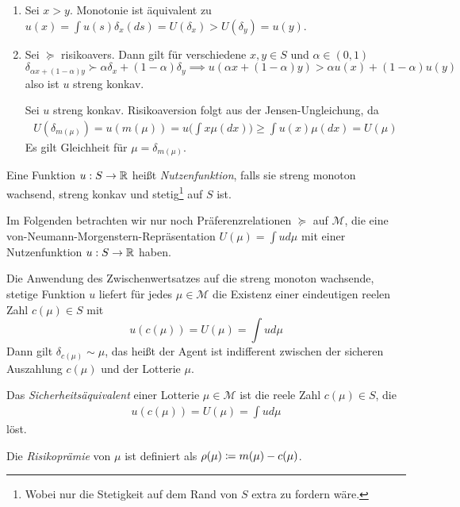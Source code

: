 \documentclass[a4paper,twoside,DIV15,BCOR12mm]{scrbook}
\newcommand{\cM}{\mathcal M}
\begin{document}
\begin{beweis}
\begin{enumerate}
\item Sei $x>y$. Monotonie ist äquivalent zu $u(x)=\int u(s) \delta_x(ds) = U(\delta_x) > U(\delta_y) = u(y)$.
\item Sei $\succeq$ risikoavers. Dann gilt für verschiedene $x,y\in S$ und $\alpha \in (0,1)$
\[
\delta_{\alpha x + (1-\alpha) y} \succ \alpha \delta_x + (1-\alpha)\delta_y
\implies
u(\alpha x + (1-\alpha ) y) > \alpha u(x) + (1-\alpha) u(y)
\]
also ist $u$ streng konkav.

Sei $u$ streng konkav. Risikoaversion folgt aus der Jensen-Ungleichung, da
\begin{align*}
U(\delta_{m(\mu)}) = u(m(\mu)) = u\Big(\int x \mu (dx)\Big) \ge \int u(x) \mu(dx) = U(\mu)
\end{align*}
Es gilt Gleichheit für $\mu = \delta_{m(\mu)}$.
\end{enumerate}
\end{beweis}

\begin{definition}
Eine Funktion $u:S\to\mathbb{R}$ heißt \emph{Nutzenfunktion}, falls sie streng monoton wachsend, streng konkav und stetig\footnote{Wobei nur die Stetigkeit auf dem Rand von $S$ extra zu fordern wäre.} auf $S$ ist.
\end{definition}

Im Folgenden betrachten wir nur noch Präferenzrelationen $\succeq$ auf $\cM$, die eine von-Neumann-Morgenstern-Repräsentation $U(\mu) = \int u d \mu$ mit einer Nutzenfunktion $u:S\to\mathbb{R}$ haben. 

Die Anwendung des Zwischenwertsatzes auf die streng monoton wachsende, stetige Funktion $u$ liefert für jedes $\mu\in\cM$ die Existenz einer eindeutigen reelen Zahl $c(\mu)\in S$ mit
\[u(c(\mu)) = U(\mu) = \int ud\mu\]
Dann gilt $\delta_{c(\mu)} \sim \mu$, das heißt der Agent ist indifferent zwischen der sicheren Auszahlung $c(\mu)$ und der Lotterie $\mu$. 

\begin{definition}
Das \emph{Sicherheitsäquivalent} einer Lotterie $\mu\in \cM$ ist die reele Zahl $c(\mu)\in S$, die 
\begin{align*}
u(c(\mu)) = U(\mu) = \int ud\mu
\end{align*}
löst.

Die \emph{Risikoprämie} von $\mu$ ist definiert als $\rho(\mu)\da m(\mu) - c(\mu)$.
\end{definition}
\end{document}
